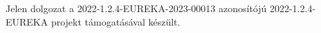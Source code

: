 \chapter*{\koszonetnyilvanitas}

Jelen dolgozat a 2022-1.2.4-EUREKA-2023-00013 azonosítójú 2022-1.2.4-EUREKA projekt támogatásával készült.